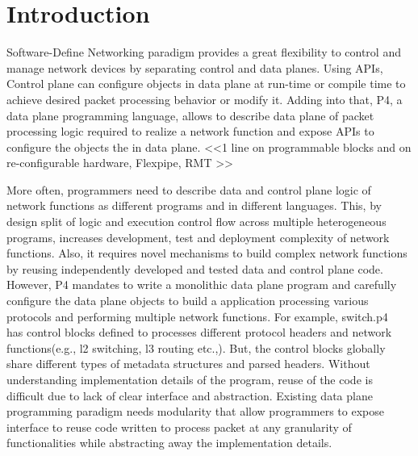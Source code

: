 \documentclass[10pt,sigconf,letterpaper,anonymous]{acmart}
\begin{document}



\maketitle

\section{Introduction}

Software-Define Networking paradigm provides a great flexibility to control and manage network devices by separating control and data planes.
Using APIs, Control plane can configure objects in data plane at run-time or compile time to achieve desired packet processing behavior or modify it.
Adding into that, P4, a data plane programming language, allows to describe data plane of packet processing logic required to realize a network function and expose APIs to configure the objects the in data plane.
<<1 line on programmable blocks and on re-configurable hardware, Flexpipe, RMT >>

More often, programmers need to describe data and control plane logic of network functions as different programs and in different languages.
This, by design split of logic and execution control flow across multiple heterogeneous programs, increases development, test and deployment complexity of network functions.
Also, it requires novel mechanisms to build complex network functions by reusing independently developed and tested data and control plane code.
However, P4 mandates to write a monolithic data plane program and carefully configure the data plane objects to build a application processing various protocols and performing multiple network functions.
For example, switch.p4~\cite{switch.p4} has control blocks defined to processes different protocol headers and network functions(e.g., l2 switching, l3 routing etc.,). 
But, the control blocks globally share different types of metadata structures and parsed headers. 
Without understanding implementation details of the program, reuse of the code is difficult due to lack of clear interface and abstraction.
Existing data plane programming paradigm needs modularity that allow programmers to expose interface to reuse code written to process packet at any granularity of functionalities while abstracting away the implementation details.
\end{document}
